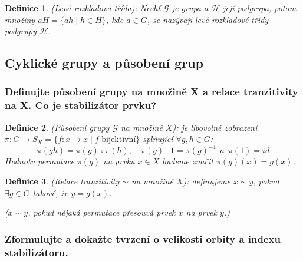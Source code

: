 \documentclass[10pt,a4paper]{article}
\newtheorem{definice}{Definice}
\begin{document}
\begin{definice} (Levá rozkladová třída): \normalfont
    Nechť $\mathcal{G}$ je grupa a $\mathcal{H}$ její podgrupa, potom množiny $aH = \{ah \mid h \in H\}$, kde $a \in G$, se nazývají \textit{levé rozkladové třídy} podgrupy $\mathcal{H}$.
\end{definice}


\subsection{Cyklické grupy a působení grup}

\subsubsection{Definujte působení grupy na množině X a relace tranzitivity na X. Co je stabilizátor prvku?}

\begin{definice} (Působení grupy $\mathcal{G}$ na množině $X$): \normalfont je libovolné zobrazení $\pi: G \to S_X=\{f:x\to x \mid f \text{ bijektivní}\}$ splňující $\forall g, h \in G$:
    $$\pi(gh) = \pi(g) \circ \pi(h), \quad \pi(g){-1} = \pi(g)^{-1} ~~a~~ \pi(1) = id$$
    Hodnotu permutace $\pi(g)$ na prvku $x \in X$ budeme značit $\pi(g)(x)=g(x)$.
\end{definice}

\begin{definice} (Relace tranzitivity $\sim$ na množině $X$): \normalfont definujeme $x \sim y$,
    pokud $\exists g \in G$ takové, že $y=g(x)$.
    
\textit{($x \sim y$, pokud nějaká permutace přesouvá prvek $x$ na prvek $y$.)}    
\end{definice}


\subsubsection{Zformulujte a dokažte tvrzení o velikosti orbity a indexu stabilizátoru.}
\end{document}

